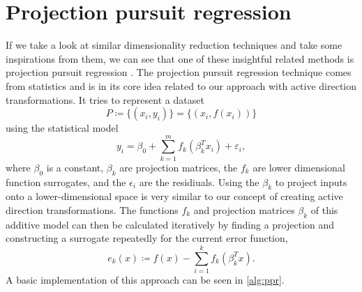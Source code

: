 \documentclass[
  a4paper,  %
  twoside,  %
  bibliography=totoc,
  headsepline,
  cleardoublepage=empty,
  parskip=half,
  draft=false
]{scrbook}
\begin{document}
\section{Projection pursuit regression}

If we take a look at similar dimensionality reduction techniques and take some inspirations from them, we can see that one of these insightful related methods is projection pursuit regression \cite{huber1985projection}.
The projection pursuit regression technique comes from statistics and is in its core idea related to our approach with active direction transformations.
It tries to represent a dataset
\begin{equation}
P \coloneqq \{(x_i, y_i)\}=\{(x_i, f(x_i))\}
\end{equation}
using the statistical model
\begin{equation}
y_i=\beta_0 + \sum_{k=1}^m f_k(\beta_k^T x_i) + \varepsilon_i,
\label{eq:ppr}
\end{equation}
where $\beta_0$ is a constant, $\beta_k$ are projection matrices, the $f_k$ are lower dimensional function surrogates, and the $\epsilon_i$ are the residiuals.
Using the $\beta_k$ to project inputs onto a lower-dimensional space is very similar to our concept of creating active direction transformations.
The functions $f_k$ and projection matrices $\beta_k$ of this additive model can then be calculated iteratively by finding a projection and constructing a surrogate repeatedly for the current error function,
\begin{equation}
e_k(x) \coloneqq f(x) - \sum_{i=1}^k f_k(\beta_k^T x).
\end{equation}
%
A basic implementation of this approach can be seen in \cref{alg:ppr}.
\end{document}
